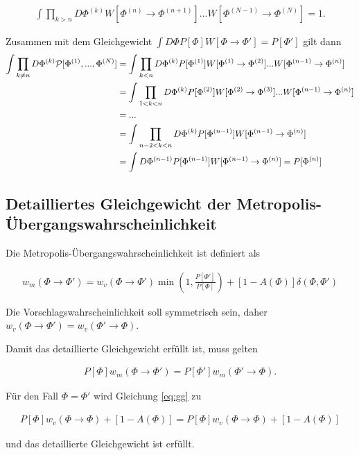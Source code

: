 \documentclass[10pt,a4paper]{article}
\begin{document}
 \begin{align*}
	\int \prod_{k > n} D\Phi^{(k)} W[\Phi^{(n)}\to \Phi^{(n+1)}]...W[\Phi^{(N-1)}\to \Phi^{(N)}]=1.
 \end{align*}

Zusammen mit dem Gleichgewicht $\int D\Phi P[\Phi] W[\Phi\to \Phi'] = P[\Phi']$ gilt dann
 \begin{align*}
      \int \prod_{k\neq n} D\Phi^{(k)} {\cal P}[\Phi^{(1)},...,\Phi^{(N)}] &= \int \prod_{k <  n} D\Phi^{(k)}P[\Phi^{(1)}] W[\Phi^{(1)}\to \Phi^{(2)}]...W[\Phi^{(n-1)}\to \Phi^{(n)}] \\
&=\int \prod_{1 < k <  n} D\Phi^{(k)}P[\Phi^{(2)}] W[\Phi^{(2)}\to \Phi^{(3)}]...W[\Phi^{(n-1)}\to \Phi^{(n)}]\\
&= ...\\
&=\int \prod_{n-2 < k <  n} D\Phi^{(k)}P[\Phi^{(n-1)}] W[\Phi^{(n-1)}\to \Phi^{(n)}] \\
&=\int  D\Phi^{(n-1)}P[\Phi^{(n-1)}] W[\Phi^{(n-1)}\to \Phi^{(n)}] = P[\Phi^{(n)}]
 \end{align*}

\subsection{Detailliertes Gleichgewicht der Metropolis-Übergangswahrscheinlichkeit}
Die Metropolis-Übergangswahrscheinlichkeit ist definiert als

\begin{align*}
	w_m(\Phi\to\Phi') = w_v(\Phi\to\Phi') \min \left(1,\frac{P[\Phi']}{P[\Phi]}\right) + [1-A(\Phi)]\delta(\Phi,\Phi')
\end{align*}

Die Vorschlagswahrscheinlichkeit soll symmetrisch sein, daher $w_v(\Phi\to\Phi')=w_v(\Phi'\to\Phi)$.

Damit das detaillierte Gleichgewicht erfüllt ist, muss gelten

\begin{align}\label{eq:gg}
P[\Phi] w_m(\Phi\to\Phi')= P[\Phi']w_m(\Phi'\to\Phi).
\end{align}

Für den Fall $\Phi = \Phi'$ wird Gleichung \ref{eq:gg} zu

\begin{align*}
	P[\Phi] w_v(\Phi\to\Phi) + [1-A(\Phi)] = P[\Phi] w_v(\Phi\to\Phi) + [1-A(\Phi)]
\end{align*}

und das detaillierte Gleichgewicht ist erfüllt.
\end{document}
